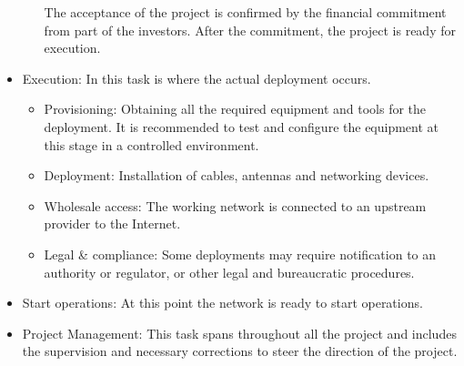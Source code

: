 \documentclass[conference]{IEEEtran}
\begin{document}
\begin{itemize}
\begin{itemize}
    The acceptance of the project is confirmed by the financial commitment from part of the investors.
    After the commitment, the project is ready for execution.
  \end{itemize}
  \item{Execution:}
  In this task is where the actual deployment occurs.
  \begin{itemize}
    \item{Provisioning:}
    Obtaining all the required equipment and tools for the deployment.
    It is recommended to test and configure the equipment at this stage in a controlled environment.
    \item{Deployment:}
    Installation of cables, antennas and networking devices.
    \item{Wholesale access:}
    The working network is connected to an upstream provider to the Internet.
    \item{Legal \& compliance:}
    Some deployments may require notification to an authority or regulator, or other legal and bureaucratic procedures.
  \end{itemize}
  \item{Start operations:}
  At this point the network is ready to start operations.
  \item{Project Management:}
  This task spans throughout all the project and includes the supervision and necessary corrections to steer the direction of the project.
\end{itemize}


\end{document}
